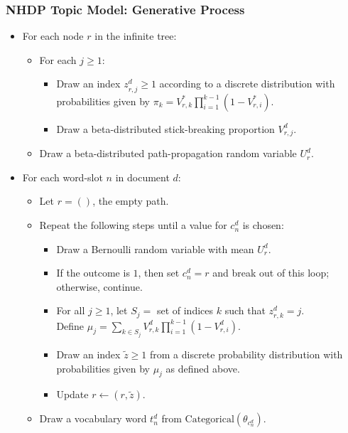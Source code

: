 \begin{frame}
\frametitle{NHDP Topic Model: Generative Process}
  \begin{itemize}[<+->]
  \item For each node $r$ in the infinite tree:
    \begin{itemize}
    \item For each $j \geq 1$:
      \begin{itemize}
      \item Draw an index $z^d_{r,j} \geq 1$ according to a discrete distribution with probabilities given by $\pi_k = V^*_{r,k} \prod_{i=1}^{k-1} (1-V^*_{r,i})$.
      \item Draw a beta-distributed stick-breaking proportion $V^d_{r,j}$.
      \end{itemize}
    \item Draw a beta-distributed path-propagation random variable $U^d_r$.
    \end{itemize}
  \item For each word-slot $n$ in document $d$:
    \begin{itemize}
    \item Let $r = ()$, the empty path.
    \item Repeat the following steps until a value for $c^d_n$ is chosen:
      \begin{itemize}
      \item Draw a Bernoulli random variable with mean $U^d_r$.
      \item If the outcome is $1$, then set $c^d_n = r$ and break out of this loop; otherwise, continue.
      \item For all $j \geq 1$, let $S_j =$ set of indices $k$ such that $z^d_{r,k} = j$. \\
      Define $\mu_j = \sum_{k \in S_j} V^d_{r,k} \prod_{i=1}^{k-1} (1-V^d_{r,i})$.
      \item Draw an index $\tilde z \geq 1$ from a discrete probability distribution with probabilities given by $\mu_j$ as defined above.
      \item Update $r \gets (r, \tilde z)$.
      \end{itemize}
    \item Draw a vocabulary word $t^d_n$ from $\text{Categorical}(\theta_{c^d_n})$.
    \end{itemize}
  \end{itemize}
\end{frame}

